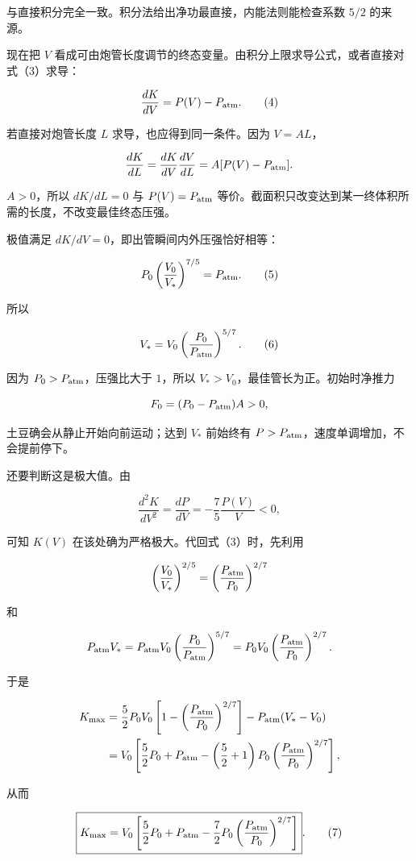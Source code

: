 \documentclass[12pt,a4paper,UTF8]{ctexart}
\begin{document}
与直接积分完全一致。积分法给出净功最直接，内能法则能检查系数 \(5/2\)
的来源。

现在把 \(V\)
看成可由炮管长度调节的终态变量。由积分上限求导公式，或者直接对式（3）求导：

\[
\frac{dK}{dV}=P(V)-P_{\rm atm}.
\tag{4}
\]

若直接对炮管长度 \(L\) 求导，也应得到同一条件。因为 \(V=AL\)，

\[
\frac{dK}{dL}
=\frac{dK}{dV}\frac{dV}{dL}
=A[P(V)-P_{\rm atm}].
\]

\(A>0\)，所以 \(dK/dL=0\) 与 \(P(V)=P_{\rm atm}\)
等价。截面积只改变达到某一终体积所需的长度，不改变最佳终态压强。

极值满足 \(dK/dV=0\)，即出管瞬间内外压强恰好相等：

\[
P_0\left(\frac{V_0}{V_*}\right)^{7/5}
=P_{\rm atm}.
\tag{5}
\]

所以

\[
V_*=V_0\left(\frac{P_0}{P_{\rm atm}}\right)^{5/7}.
\tag{6}
\]

因为 \(P_0>P_{\rm atm}\)，压强比大于 \(1\)，所以
\(V_*>V_0\)，最佳管长为正。初始时净推力

\[
F_0=(P_0-P_{\rm atm})A>0,
\]

土豆确会从静止开始向前运动；达到 \(V_*\) 前始终有
\(P>P_{\rm atm}\)，速度单调增加，不会提前停下。

还要判断这是极大值。由

\[
\frac{d^2K}{dV^2}=\frac{dP}{dV}
=-\frac75\frac{P(V)}{V}<0,
\]

可知 \(K(V)\) 在该处确为严格极大。代回式（3）时，先利用

\[
\left(\frac{V_0}{V_*}\right)^{2/5}
=\left(\frac{P_{\rm atm}}{P_0}\right)^{2/7}
\]

和

\[
P_{\rm atm}V_*
=P_{\rm atm}V_0
\left(\frac{P_0}{P_{\rm atm}}\right)^{5/7}
=P_0V_0
\left(\frac{P_{\rm atm}}{P_0}\right)^{2/7}.
\]

于是

\[
\begin{aligned}
K_{\max}
&=\frac52P_0V_0
\left[1-\left(\frac{P_{\rm atm}}{P_0}\right)^{2/7}\right]
-P_{\rm atm}(V_*-V_0)\\
&=V_0\left[
\frac52P_0+P_{\rm atm}
-\left(\frac52+1\right)P_0
\left(\frac{P_{\rm atm}}{P_0}\right)^{2/7}
\right],
\end{aligned}
\]

从而

\[
\boxed{
K_{\max}
=V_0\left[
\frac52P_0+P_{\rm atm}
-\frac72P_0
\left(\frac{P_{\rm atm}}{P_0}\right)^{2/7}
\right]
}.
\tag{7}
\]
\end{document}
